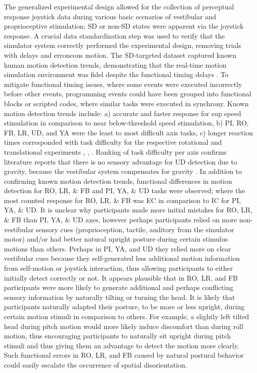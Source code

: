 \documentclass{ieeeaccess}
\begin{document}
\indent The generalized experimental design allowed for the collection of perceptual response joystick data during various basic scenarios of vestibular and proprioceptive stimulation; SD or non-SD states were apparent via the joystick response. A crucial data standardization step was used to verify that the simulator system correctly performed the experimental design, removing trials with delays and erroneous motion. The SD-targeted dataset captured known human motion detection trends, demonstrating that the real-time motion simulation environment was fidel despite the functional timing delays \cite{Stoffregen_2003_Nature}. To mitigate functional timing issues, where some events were executed incorrectly before other events, programming events could have been grouped into functional blocks or scripted codes, where similar tasks were executed in synchrony. Known motion detection trends include: a) accurate and faster response for sup speed stimulation in comparison to near below-threshold speed stimulation, b) PI, RO, FB, LR, UD, and YA were the least to most difficult axis tasks, c) longer reaction times corresponded with task difficulty for the respective rotational and translational experiments \cite{Valko_2012_Vestibular}, \cite{Hartmann_2014_Direction}, \cite{Karmali_2017_Multivariate}. Ranking of task difficulty per axis confirms literature reports that there is no sensory advantage for UD detection due to gravity, because the vestibular system compensates for gravity \cite{Valko_2012_Vestibular}. In addition to confirming known motion detection trends, functional differences in motion detection for RO, LR, \& FB and PI, YA, \& UD tasks were observed; where the most counted response for RO, LR, \& FB was EC in comparison to IC for PI, YA, \& UD. It is unclear why participants made more initial mistakes for RO, LR, \& FB than PI, YA, \& UD axes, however perhaps participants relied on more non-vestibular sensory cues (proprioception, tactile, auditory from the simulator motor) and/or had better natural upright posture during certain stimulus motions than others. Perhaps in PI, YA, and UD they relied more on clear vestibular cues because they self-generated less additional motion information from self-motion or joystick interaction, thus allowing participants to either initially detect correctly or not.
It appears plausible that in RO, LR, and FB participants were more likely to generate additional and perhaps conflicting sensory information by naturally tilting or turning the head. It is likely that participants naturally adapted their posture, to be more or less upright, during certain motion stimuli in comparison to others. For example, a slightly left tilted head during pitch motion would more likely induce discomfort than during roll motion, thus encouraging participants to naturally sit upright during pitch stimuli and thus giving them an advantage to detect the motion more clearly. Such functional errors in RO, LR, and FB caused by natural postural behavior could easily escalate the occurrence of spatial disorientation.
\end{document}
